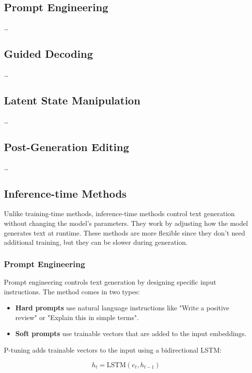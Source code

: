 \subsection{Prompt Engineering}
\dots

\subsection{Guided Decoding}
\dots

\subsection{Latent State Manipulation}
\dots

\subsection{Post-Generation Editing}
\dots


\subsection{Inference-time Methods}

Unlike training-time methods, inference-time methods control text generation without changing the model's parameters. They work by adjusting how the model generates text at runtime. These methods are more flexible since they don't need additional training, but they can be slower during generation.

\subsubsection{Prompt Engineering}

Prompt engineering controls text generation by designing specific input instructions. The method comes in two types:

\begin{itemize}
    \item \textbf{Hard prompts} use natural language instructions like "Write a positive review" or "Explain this in simple terms".
    \item \textbf{Soft prompts} use trainable vectors that are added to the input embeddings.
\end{itemize}

P-tuning adds trainable vectors to the input using a bidirectional LSTM:

\begin{equation}
    h_t = \text{LSTM}(e_t, h_{t-1})
\end{equation}


